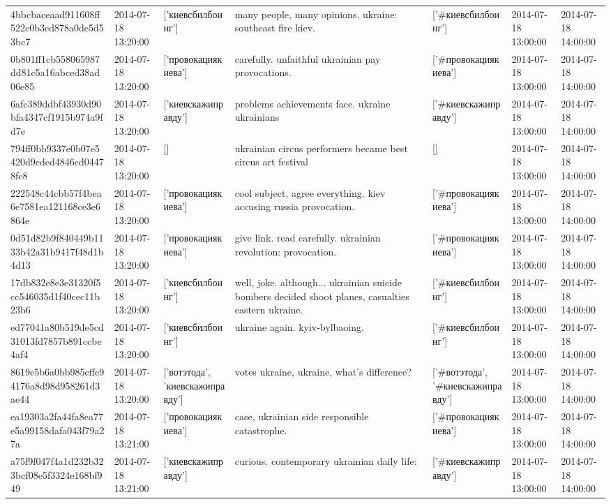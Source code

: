 \begin{tabular}{lllllll}
4bbcbaceaad911608ff522c0b3ed878a0de5d53bc7 & 2014-07-18 13:20:00 & ['киевсбилбоинг'] & many people, many opinions. ukraine: southeast fire kiev. & ['#киевсбилбоинг'] & 2014-07-18 13:00:00 & 2014-07-18 14:00:00 \\
0b801ff1cb558065987dd81c5a16abced38ad06e85 & 2014-07-18 13:20:00 & ['провокациякиева'] & carefully. unfaithful ukrainian pay provocations. & ['#провокациякиева'] & 2014-07-18 13:00:00 & 2014-07-18 14:00:00 \\
6afc389ddbf43930d90bfa4347cf1915b974a9fd7e & 2014-07-18 13:20:00 & ['киевскажиправду'] & problems achievements face. ukraine ukrainians & ['#киевскажиправду'] & 2014-07-18 13:00:00 & 2014-07-18 14:00:00 \\
794ff0bb9337e0b07e5420d9cded4846cd04478fc8 & 2014-07-18 13:20:00 & [] & ukrainian circus performers became best circus art festival & [] & 2014-07-18 13:00:00 & 2014-07-18 14:00:00 \\
222548c44cbb57f4bea6e7581ea121168ce3e6864e & 2014-07-18 13:20:00 & ['провокациякиева'] & cool subject, agree everything. kiev accusing russia provocation. & ['#провокациякиева'] & 2014-07-18 13:00:00 & 2014-07-18 14:00:00 \\
0d51d82b9f840449b1133b42a31b9417f48d1b4d13 & 2014-07-18 13:20:00 & ['провокациякиева'] & give link. read carefully. ukrainian revolution: provocation. & ['#провокациякиева'] & 2014-07-18 13:00:00 & 2014-07-18 14:00:00 \\
17db832e8e3e31320f5cc546035d1f40cec11b23b6 & 2014-07-18 13:20:00 & ['киевсбилбоинг'] & well, joke. although... ukrainian suicide bombers decided shoot planes, casualties eastern ukraine. & ['#киевсбилбоинг'] & 2014-07-18 13:00:00 & 2014-07-18 14:00:00 \\
ed77041a80b519de5cd31013fd7857b891ccbe4af4 & 2014-07-18 13:20:00 & ['киевсбилбоинг'] & ukraine again. kyiv-bylbaoing. & ['#киевсбилбоинг'] & 2014-07-18 13:00:00 & 2014-07-18 14:00:00 \\
8619e5b6a0bb985cffe94176a8d98d958261d3ae44 & 2014-07-18 13:20:00 & ['вотэтода', 'киевскажиправду'] & votes ukraine, ukraine, what's difference? & ['#вотэтода', '#киевскажиправду'] & 2014-07-18 13:00:00 & 2014-07-18 14:00:00 \\
ea19303a2fa44fa8ea77e5a99158dafa043f79a27a & 2014-07-18 13:21:00 & ['провокациякиева'] & case, ukrainian side responsible catastrophe. & ['#провокациякиева'] & 2014-07-18 13:00:00 & 2014-07-18 14:00:00 \\
a75f9f047f4a1d232b323bcf08e5f3324e168bf949 & 2014-07-18 13:21:00 & ['киевскажиправду'] & curious. contemporary ukrainian daily life: & ['#киевскажиправду'] & 2014-07-18 13:00:00 & 2014-07-18 14:00:00 \\

\end{tabular}
